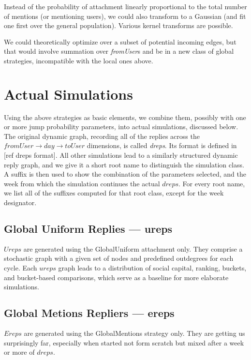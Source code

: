\documentclass[10pt,oneside]{memoir}
\begin{document}
Instead of the probability of attachment linearly proportional to the total number of mentions (or mentioning users), we could also transform to a Gaussian (and fit one first over the general population).  Various kernel transforms are possible.


We could theoretically optimize over a subset of potential incoming edges, but that would involve summation over \emph{fromUser}s and be in a new class of global strategies, incompatible with the local ones above.


\pagebreak \section{Actual Simulations}
\label{actualsimulations}

Using the above strategies as basic elements, we combine them, possibly with one or more jump probability parameters, into actual simulations, discussed below.  The original dynamic graph, recording all of the replies across the $fromUser \rightarrow day \rightarrow toUser$ dimensions, is called \emph{dreps}.  Its format is defined in [ref dreps format].  All other simulations lead to a similarly structured dynamic reply graph, and we give it a short root name to distinguish the simulation class.  A suffix is then used to show the combination of the parameters selected, and the week from which the simulation continues the actual $dreps$.  For every root name, we list all of the suffixes computed for that root class, except for the week designator.


\subsection{Global Uniform Replies --- ureps}
\label{globaluniformrepliesureps}

$Ureps$ are generated using the GlobalUniform attachment only.  They comprise a stochastic graph with a given set of nodes and predefined outdegrees for each cycle.  Each $ureps$ graph leads to a distribution of social capital, ranking, buckets, and bucket-based comparisons, which serve as a baseline for more elaborate simulations.


\subsection{Global Metions Repliers --- ereps}
\label{globalmetionsrepliersereps}

$Ereps$ are generated using the GlobalMentions strategy only.  They are getting us surprisingly far, especially when started not form scratch but mixed after a week or more of $dreps$.
\end{document}

